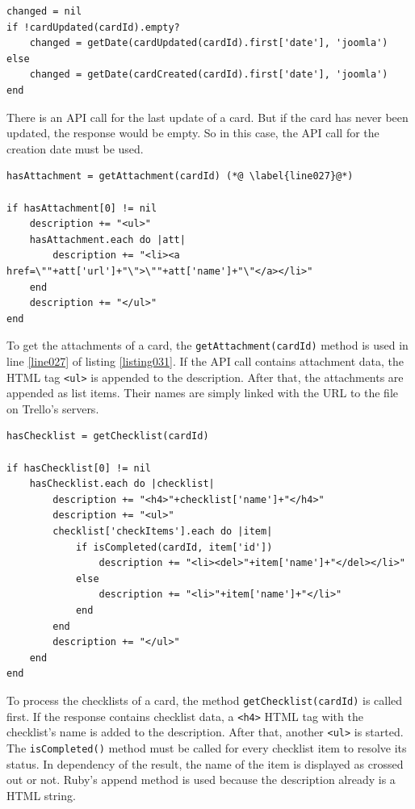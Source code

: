\begin{lstlisting}[aboveskip=1\baselineskip, caption=Getting the date of a cards last change., label=listing030]
changed = nil
if !cardUpdated(cardId).empty?
	changed = getDate(cardUpdated(cardId).first['date'], 'joomla')
else
	changed = getDate(cardCreated(cardId).first['date'], 'joomla')
end
\end{lstlisting}
There is an API call for the last update of a card. But if the card has never been updated, the response would be empty. So in this case, the API call for the creation date must be used.

\begin{lstlisting}[aboveskip=1\baselineskip, caption=Processing the attachments of a card., label=listing031]
hasAttachment = getAttachment(cardId) (*@ \label{line027}@*)

if hasAttachment[0] != nil
	description += "<ul>"		
	hasAttachment.each do |att|	
		description += "<li><a href=\""+att['url']+"\">\""+att['name']+"\"</a></li>"
	end
	description += "</ul>"
end
\end{lstlisting}

To get the attachments of a card, the \lstinline{getAttachment(cardId)} method is used in line \ref{line027} of listing \ref{listing031}. If the API call contains attachment data, the HTML tag \lstinline{<ul>} is appended to the description. After that, the attachments are appended as list items. Their names are simply linked with the URL to the file on Trello's servers. 

\begin{lstlisting}[aboveskip=1\baselineskip, caption=Processing the checklists of a card., label=listing032]
hasChecklist = getChecklist(cardId) 

if hasChecklist[0] != nil
	hasChecklist.each do |checklist| 			
		description += "<h4>"+checklist['name']+"</h4>"
		description += "<ul>"
		checklist['checkItems'].each do |item|	
			if isCompleted(cardId, item['id'])
				description += "<li><del>"+item['name']+"</del></li>"
			else
				description += "<li>"+item['name']+"</li>"
			end
		end
		description += "</ul>"
	end	
end
\end{lstlisting}

To process the checklists of a card, the method \lstinline{getChecklist(cardId)} is called first. If the response contains checklist data, a \lstinline{<h4>} HTML tag with the checklist's name is added to the description. After that, another \lstinline{<ul>} is started. The \lstinline{isCompleted()} method must be called for every checklist item to resolve its status. In dependency of the result, the name of the item is displayed as crossed out or not. Ruby's append method is used because the description already is a HTML string.


